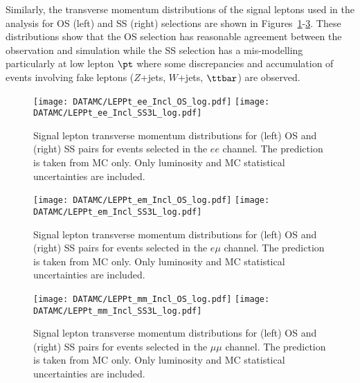 Similarly, the transverse momentum distributions of the signal leptons used in the analysis for OS (left) and SS (right) selections are shown in 
Figures~\ref{fig:dataMC_lep1.ee}-\ref{fig:dataMC_lep1.mm}. These distributions show that the OS selection has reasonable agreement between the observation 
and simulation while the SS selection has a mis-modelling particularly at low
lepton $\pt$ where some discrepancies and accumulation of events involving fake leptons ($Z$+jets, $W$+jets, $\ttbar$) are observed. 
 \begin{figure}[htb!]
 \centering
 {\texttt{[image: DATAMC/LEPPt\_ee\_Incl\_OS\_log.pdf]}}
 {\texttt{[image: DATAMC/LEPPt\_ee\_Incl\_SS3L\_log.pdf]}}
\caption{Signal lepton transverse momentum distributions for (left) OS and (right) SS  pairs for events selected in the $ee$ channel.  
The prediction is taken from MC only.
Only luminosity and MC statistical uncertainties are included.
}
\label{fig:dataMC_lep1.ee}
\end{figure}
 \begin{figure}[htb!]
 \centering
{\texttt{[image: DATAMC/LEPPt\_em\_Incl\_OS\_log.pdf]}}
{\texttt{[image: DATAMC/LEPPt\_em\_Incl\_SS3L\_log.pdf]}}
\caption{Signal lepton transverse momentum distributions for (left) OS and (right) SS  pairs for events selected in the $e\mu$ channel.
The prediction is taken from MC only.
Only luminosity and MC statistical uncertainties are included.
}
\label{fig:dataMC_lep1.em}
\end{figure}
 \begin{figure}[htb!]
 \centering
{\texttt{[image: DATAMC/LEPPt\_mm\_Incl\_OS\_log.pdf]}}
{\texttt{[image: DATAMC/LEPPt\_mm\_Incl\_SS3L\_log.pdf]}}
\caption{Signal lepton transverse momentum distributions for (left) OS and (right) SS pairs for events selected in the $\mu\mu$ channel.  
The prediction is taken from MC only.
Only luminosity and MC statistical uncertainties are included.
}
\label{fig:dataMC_lep1.mm}
\end{figure}


